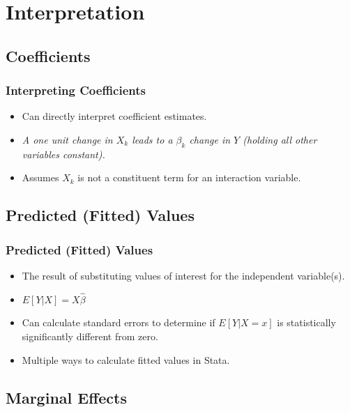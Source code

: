 \documentclass{beamer}
\begin{document}
\section{Interpretation}
\subsection{Coefficients}

\begin{frame}
	\frametitle{Interpreting Coefficients}
		\begin{itemize}
			\item Can directly interpret coefficient estimates.
			\item \textit{A one unit change in $X_{k}$ leads to a $\beta_{k}$ change in $Y$ (holding all other variables constant).}
			\item Assumes $X_{k}$ is not a constituent term for an interaction variable. 
		\end{itemize}
\end{frame}

\subsection{Predicted (Fitted) Values}

\begin{frame}
	\frametitle{Predicted (Fitted) Values}
		\begin{itemize}
			\item The result of substituting values of interest for the independent variable(s).
			\item $E[Y|X]=X\hat{\beta}$
			\item Can calculate standard errors to determine if $E[Y|X=x]$ is statistically significantly different from zero.
			\item Multiple ways to calculate fitted values in Stata.
		\end{itemize}
\end{frame}

\subsection{Marginal Effects}
\end{document}
